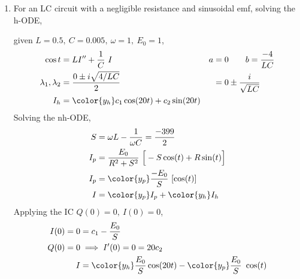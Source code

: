 \begin{enumerate}
    \item For an LC circuit with a negligible resistance and sinusoidal emf, solving the h-ODE, \par
          given $ L = 0.5,\ C = 0.005,\ \omega = 1,\ E_{0} = 1$,
          \begin{align}
              \cos t                   & = LI'' + \frac{1}{C}\ I                          & a & = 0 \qquad b = \frac{-4}{LC} \\
              \lambda_{1}, \lambda_{2} & = \frac{0 \pm i\sqrt{4/LC}}{2}                   &   & = 0 \pm \frac{i}{\sqrt{LC}}  \\
              I_{h}                    & = {\color{y_h} c_{1}\cos(20 t)+ c_{2}\sin(20 t)}
          \end{align}
          Solving the nh-ODE,
          \begin{align}
              S     & = \omega L - \frac{1}{\omega C} = \frac{-399}{2}              \\
              I_{p} & = \frac{E_{0}}{R^{2} + S^{2}}\ \Big[-S\cos(t) + R\sin(t)\Big] \\
              I_{p} & = {\color{y_p} \frac{-E_{0}}{S}\ [\cos(t)]}                   \\
              I     & ={\color{y_p} I_{p}} + {\color{y_h}I_{h}}
          \end{align}
          Applying the IC $ Q(0) = 0,\ I(0) = 0 $,
          \begin{align}
              I(0) = 0 & = c_{1} - \frac{E_{0}}{S}                                                          \\
              Q(0) = 0 & \implies I'(0) = 0 = 20c_{2}                                                       \\
              I        & = {\color{y_h} \frac{E_{0}}{S} \cos(20t)} - {\color{y_p} \frac{E_{0}}{S}\ \cos(t)}
          \end{align}
          \begin{figure}[H]
              \centering
          \end{figure}


\end{enumerate}
